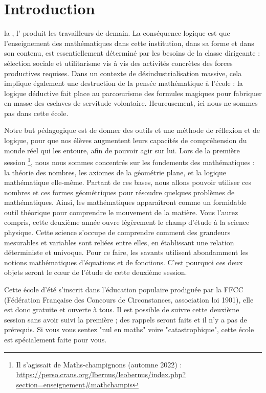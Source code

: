 
\chapter*{Introduction}

 la , l' produit les travailleurs de demain. La conséquence logique est que l'enseignement des mathématiques dans cette institution, dans sa forme et dans son contenu, est essentiellement déterminé par les besoins de la classe dirigeante : sélection sociale et utilitarisme vis à vis des activités concrètes des forces productives requises. Dans un contexte de désindustrialisation massive, cela implique également une destruction de la pensée mathématique à l'école : la logique déductive fait place au parcœurisme des formules magiques pour fabriquer en masse des esclaves de servitude volontaire.
Heureusement, ici nous ne sommes pas dans cette école.

Notre but pédagogique est de donner des outils et une méthode de réflexion et de logique, pour que nos élèves augmentent leurs capacités de compréhension du monde réel qui les entoure, afin de pouvoir agir sur lui. 
Lors de la première session \footnote{Il s'agissait de Maths-champignons (automne 2022) : \url{https://perso.crans.org/lbernus/leobernus/index.php?section=enseignement\#mathchampis}}, 
nous nous sommes concentrés sur les fondements des mathématiques : la théorie des nombres, les axiomes de la géométrie plane, et la logique mathématique elle-même. 
Partant de ces bases, nous allons pouvoir utiliser ces nombres et ces formes géométriques pour résoudre quelques problèmes de mathématiques. Ainsi, les mathématiques apparaîtront comme un formidable outil théorique pour comprendre le mouvement de la matière. Vous l'aurez compris, cette deuxième année ouvre légèrement le champ d'étude à la science physique. Cette science s'occupe de comprendre comment des grandeurs mesurables et variables sont reliées entre elles, en établissant une relation déterministe et univoque. Pour ce faire, les savants utilisent abondamment les notions mathématiques d'équations et de fonctions. C'est pourquoi ces deux objets seront le cœur de l'étude de cette deuxième session.

Cette école d'été s'inscrit dans l'éducation populaire prodiguée par la FFCC (Fédération Française des Concours de Circonstances, association loi 1901), elle est donc gratuite et ouverte à tous. Il est possible de suivre cette deuxième session sans avoir suivi la première ; des rappels seront faits et il n'y a pas de prérequis. Si vous vous sentez "nul en maths" voire "catastrophique", cette école est spécialement faite pour vous.


